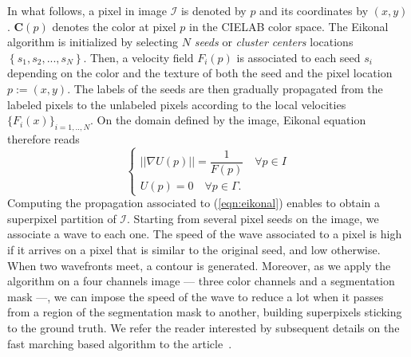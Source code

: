 \documentclass{article}
\begin{document}
            In what follows, a pixel in image $\mathcal{I}$ is denoted by $p$ and its coordinates by $(x, y)$. $\mathbf{C}(p)$ denotes the color at pixel $p$ in the CIELAB color space. The Eikonal algorithm is initialized by selecting $N$ \textit{seeds} or \textit{cluster centers} locations $\left\{s_1, s_2, ..., s_N \right\}$. Then, a velocity field $F_i(p)$ is associated to each seed $s_i$ depending on the color and the texture of both the seed and the pixel location $p:=(x, y)$. The labels of the seeds are then gradually propagated from the labeled pixels to the unlabeled pixels according to the local velocities $\{F_i(x)\}_{i = 1, .., N}$. On the domain defined by the image, Eikonal equation therefore reads
            \begin{equation}
              \begin{cases}
                ||\nabla U(p)|| = \dfrac{1}{F(p)}\quad \forall p \in I\\
                U(p) = 0    \quad \forall p \in \Gamma.
              \end{cases}
              \label{eqn:eikonal}
            \end{equation}
            Computing the propagation associated to (\ref{eqn:eikonal}) enables to obtain a superpixel partition of $\mathcal{I}$.
            Starting from several pixel seeds on the image, we associate a wave to each one. The speed of the wave associated to a pixel is high if it arrives on a pixel that is similar to the original seed, and low otherwise. When two wavefronts meet, a contour is generated. Moreover, as we apply the algorithm on a four channels image --- three color channels and a segmentation mask ---, we can impose the speed of the wave to reduce a lot when it passes from a region of the segmentation mask to another, building superpixels sticking to the ground truth. We refer the reader interested by subsequent details on the fast marching based algorithm to the article~\cite{figliuzzi2019}.


\newpage
\end{document}
